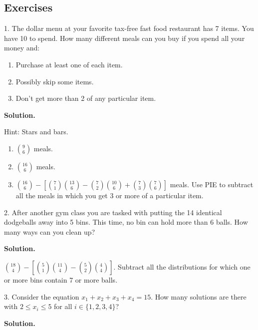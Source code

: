 \documentclass[10pt,]{book}
\theoremstyle{plain}
\theoremstyle{definition}
\theoremstyle{definition}
\theoremstyle{definition}
\numberwithin{equation}{section}
\begin{document}
\subsection[Exercises]{Exercises}\label{exercises-9}
\begin{exerciselist}
\item[1.]\hypertarget{exercise-92}{}
            The dollar menu at your favorite tax-free fast food restaurant has 7 items. You have
            \textdollar{}10 to spend. How many different meals can you buy if you spend all your money and:
\leavevmode%
\begin{enumerate}[label=(\alph*)]
\item\hypertarget{li-639}{}
                Purchase at least one of each item.
\item\hypertarget{li-640}{}
                Possibly skip some items.
\item\hypertarget{li-641}{}
                Don't get more than 2 of any particular item.
\end{enumerate}
\par\smallskip
\par\smallskip
\noindent\textbf{Solution.}\hypertarget{solution-143}{}\quad

            Hint: Stars and bars.
\leavevmode%
\begin{enumerate}[label=(\alph*)]
\item\hypertarget{li-642}{}\({9 \choose 6}\) meals.%
\item\hypertarget{li-643}{}\({16 \choose 6}\) meals.%
\item\hypertarget{li-644}{}\({16 \choose 6} - \left[{7 \choose 1}{13 \choose 6} - {7 \choose 2}{10 \choose 6} + {7 \choose 3}{7 \choose 6}\right]\) meals.  Use PIE to subtract all the meals in which you get 3 or more of a particular item.%
\end{enumerate}
\item[2.]\hypertarget{exercise-93}{}
            After another gym class you are tasked with putting the 14 identical dodgeballs away into 5 bins. This time, no bin can hold more than 6 balls. How many ways can you clean up?
\par\smallskip
\par\smallskip
\noindent\textbf{Solution.}\hypertarget{solution-144}{}\quad

            \({18 \choose 4} - \left[ {5 \choose 1}{11 \choose 4} - {5 \choose 2}{4 \choose 4}\right]\). Subtract all the distributions for which one or more bins contain 7 or more balls.
\item[3.]\hypertarget{exercise-94}{}
            Consider the equation \(x_1 + x_2 + x_3 + x_4 = 15\). How many solutions are there with \(2 \le x_i \le 5\) for all \(i \in \{1,2,3,4\}\)?
\par\smallskip
\par\smallskip
\noindent\textbf{Solution.}\hypertarget{solution-145}{}\quad


\end{exerciselist}
\end{document}
